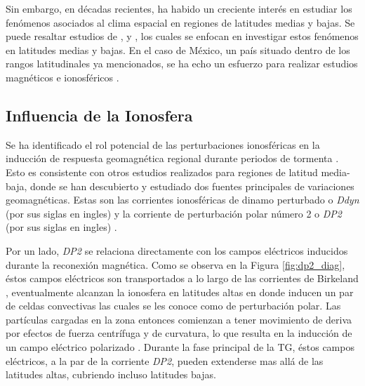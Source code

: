 Sin embargo, en décadas recientes, ha habido un creciente interés en estudiar los fenómenos asociados al clima espacial en regiones de latitudes medias y bajas. Se puede resaltar estudios de \cite{gic_czech, gic_brazil}, y \cite{gic}, los cuales se enfocan en investigar estos fenómenos en latitudes medias y bajas. En el caso de México, un país situado dentro de los rangos latitudinales ya mencionados, se ha echo un esfuerzo para realizar estudios magnéticos e ionosféricos \cite{MEXART2003, MEXART2005, lenica, MEXART_iono_dist, MEXART_iono_dist2, mario_rodriguez2011, lopez-montes, mario_rodriguez2014, iono-resp2016}. 

\subsection{Influencia de la Ionosfera}
\label{diono}

Se ha identificado el rol potencial de las perturbaciones ionosféricas en la inducción de respuesta geomagnética regional durante periodos de tormenta \cite[see][]{esmeralda, dramaria_1, dramaria7, P-corona1, P-corona2}. Esto es consistente con otros estudios realizados para regiones de latitud media-baja, donde se han descubierto y estudiado dos fuentes principales de variaciones geomagnéticas. Estas son las corrientes ionosféricas de dinamo perturbado o \emph{Ddyn} (por sus siglas en ingles) \cite{blanc_ddyn} y la corriente de perturbación polar número 2 o \emph{DP2} (por sus siglas en ingles) \cite{nishida_68_coherence, nishida_68_fluctuations, nishida_66_knee}.
\vspace{1 em}

Por un lado, \emph{DP2} se relaciona directamente con los campos eléctricos inducidos durante la reconexión magnética. Como se observa en la Figura \ref{fig:dp2_diag}, éstos campos eléctricos son transportados a lo largo de las corrientes de Birkeland \cite{dp2PPEF, dp2_diag}, eventualmente alcanzan la ionosfera en latitudes altas en donde inducen un par de celdas convectivas las cuales se les conoce como de perturbación polar. Las partículas cargadas en la zona entonces comienzan a tener movimiento de deriva por efectos de fuerza centrífuga y de curvatura, lo que resulta en la inducción de un campo eléctrico polarizado \cite{Hepner_a, Hepner_b, Pudovkin, blanc_caudal, Denisenko}. Durante la fase principal de la TG, éstos campos eléctricos, a la par de la corriente \emph{DP2}, pueden extenderse mas allá de las latitudes altas, cubriendo incluso latitudes bajas\cite{nishida_66_knee, nishida_68_coherence, nishida_andobayashi_67}.
\vspace{1 em}

